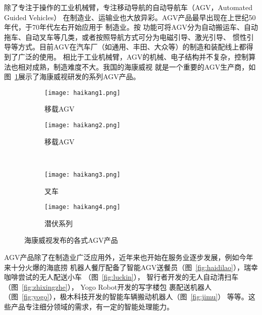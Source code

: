 除了专注于操作的工业机械臂，专注移动导航的自动导航车（AGV，Automated Guided Vehicles）
在制造业、运输业也大放异彩。AGV产品最早出现在上世纪50年代，于70年代左右开始应用于
制造业\cite{黄志球2010自动导航车}。按
功能可将AGV分为自动搬运车、自动拖车、自动叉车等几类，或者按照导航方式可分为电磁引导、激光引导、
惯性引导等方式。目前AGV在汽车厂（如通用、丰田、大众等）的制造和装配线上都得到了广泛的使用。
相比于工业机械臂，AGV的机械、电子结构并不复杂，控制算法也相对成熟，制造难度不大。我国的海康威视
就是一个重要的AGV生产商，如图~\ref{fig:haikang}展示了海康威视研发的系列AGV产品。

\begin{figure}
\centering
\begin{subfigure}{.5\textwidth}
  \centering
  \texttt{[image: haikang1.png]}
  \caption{移载AGV}
\end{subfigure}%
\begin{subfigure}{.5\textwidth}
  \centering
  \texttt{[image: haikang2.png]}
  \caption{移载AGV}
\end{subfigure}%
\\
\begin{subfigure}{.5\textwidth}
  \centering
  \texttt{[image: haikang3.png]}
  \caption{叉车}
\end{subfigure}%
\begin{subfigure}{.5\textwidth}
  \centering
  \texttt{[image: haikang4.png]}
  \caption{潜伏系列}
\end{subfigure}%
\caption{海康威视发布的各式AGV产品}
\label{fig:haikang}
\end{figure}

AGV产品除了在制造业广泛应用外，近年来也开始在服务业逐步发展，例如今年来十分火爆的海底捞
机器人餐厅配备了智能AGV送餐员（图~\ref{fig:haidilao}），瑞幸咖啡尝试的无人配送小车
（图~\ref{fig:luckin}），
智行者开发的无人自动清扫车（图~\ref{fig:zhixingzhe}）， Yogo Robot开发的写字楼包
裹配送机器人（图~\ref{fig:yogo}），极木科技开发的智能车辆搬动机器人（图~\ref{fig:jimu}）
等等。这些产品专注细分领域的需求，有一定的智能处理能力。


